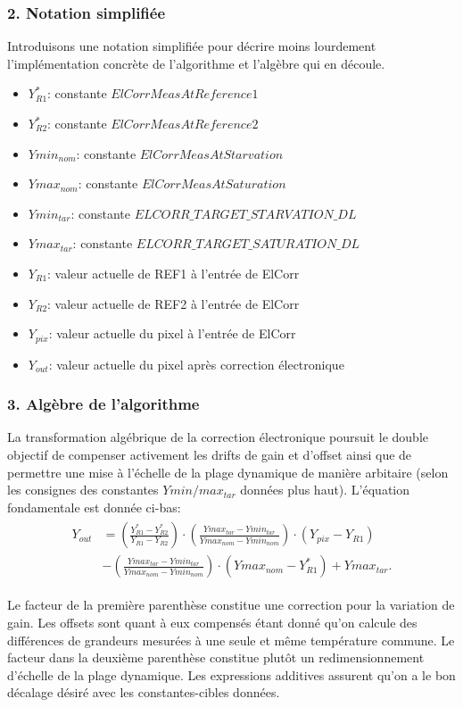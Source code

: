 \documentclass[11pt]{report}
\newcommand{\fone}{\left(\frac{Y_{R1}^*-Y_{R2}^*}{Y_{R1}-Y_{R2}}\right)}
\newcommand{\ftwo}{\left(\frac{Ymax_{tar}-Ymin_{tar}}{Ymax_{nom}-Ymin_{nom}}\right)}
\begin{document}
\subsubsection{2. Notation simplifiée}
Introduisons une notation simplifiée pour décrire moins lourdement l'implémentation concrète de l'algorithme et l'algèbre qui en découle.
\begin{itemize}[label=$\circ$]
\item $Y_{R1}^*$: constante $ElCorrMeasAtReference1$
\item $Y_{R2}^*$: constante $ElCorrMeasAtReference2$
\item $Ymin_{nom}$: constante $ElCorrMeasAtStarvation$
\item $Ymax_{nom}$: constante $ElCorrMeasAtSaturation$
\item $Ymin_{tar}$: constante $ELCORR\_TARGET\_STARVATION\_DL$
\item $Ymax_{tar}$: constante $ELCORR\_TARGET\_SATURATION\_DL$
\item $Y_{R1}$: valeur actuelle de REF1 à l'entrée de ElCorr
\item $Y_{R2}$: valeur actuelle de REF2 à l'entrée de ElCorr
\item $Y_{pix}$: valeur actuelle du pixel à l'entrée de ElCorr
\item $Y_{out}$: valeur actuelle du pixel après correction électronique
\end{itemize}

\subsubsection{3. Algèbre de l'algorithme}
La transformation algébrique de la correction électronique poursuit le double objectif de compenser activement les drifts de gain et d'offset ainsi que de permettre une mise à l'échelle de la plage dynamique de manière arbitaire (selon les consignes des constantes $Ymin/max_{tar}$ données plus haut). L'équation fondamentale est donnée ci-bas:
\begin{align}
\begin{split}
\label{eq:1}
Y_{out} &= \fone\cdot\ftwo\cdot(Y_{pix}-Y_{R1})\\
        &- \ftwo\cdot
        (Ymax_{nom}-Y_{R1}^*) + Ymax_{tar}.
\end{split}
\end{align}

Le facteur de la première parenthèse constitue une correction pour la variation de gain. Les offsets sont quant à eux compensés étant donné qu'on calcule des différences de grandeurs mesurées à une seule et même température commune. Le facteur dans la deuxième parenthèse constitue plutôt un redimensionnement d'échelle de la plage dynamique. Les expressions additives assurent qu'on a le bon décalage désiré avec les constantes-cibles données.
\end{document}
